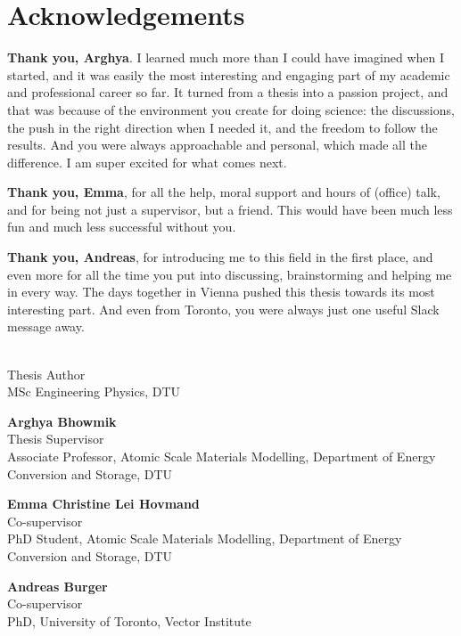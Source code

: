
\section*{Acknowledgements}

\textbf{Thank you, Arghya}. I learned much more than I could have imagined when I
started, and it was easily the most interesting and engaging part of my
academic and professional career so far. It turned from a thesis into a
passion project, and that was because of the environment you create for
doing science: the discussions, the push in the right direction when I
needed it, and the freedom to follow the results. And you were always
approachable and personal, which made all the difference. I am super
excited for what comes next.

\textbf{Thank you, Emma}, for all the help, moral support and hours of (office)
talk, and for being not just a supervisor, but a friend. This would have
been much less fun and much less successful without you.

\textbf{Thank you, Andreas}, for introducing me to this field in the first place, and
even more for all the time you put into discussing, brainstorming and
helping me in every way. The days together in Vienna pushed this thesis
towards its most interesting part. And even from Toronto, you were always
just one useful Slack message away.

\vspace{2em}

\newcommand{\person}[3]{\par\noindent\begin{minipage}{\linewidth}\raggedright
  \textbf{#1}\\[1pt]
  #2\\[1pt]
  #3
\end{minipage}\par\vspace{1.2em}}

\person{\thesisauthor}{Thesis Author}{MSc Engineering Physics, DTU}
\person{Arghya Bhowmik}{Thesis Supervisor}{Associate Professor, Atomic Scale Materials Modelling, Department of Energy Conversion and Storage, DTU}
\person{Emma Christine Lei Hovmand}{Co-supervisor}{PhD Student, Atomic Scale Materials Modelling, Department of Energy Conversion and Storage, DTU}
\person{Andreas Burger}{Co-supervisor}{PhD, University of Toronto, Vector Institute}
